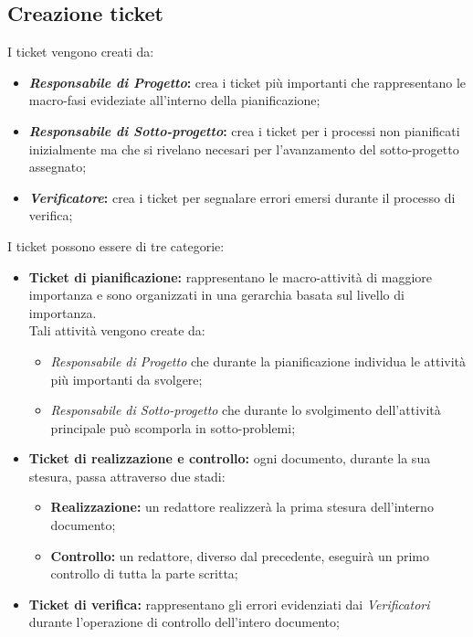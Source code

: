   \subsection{Creazione ticket}
    I ticket vengono creati da:
    \begin{itemize}
      \item \textbf{\emph{Responsabile di Progetto}: }crea i ticket più importanti che rappresentano le macro-fasi evideziate
      all'interno della pianificazione;
      \item \textbf{\emph{Responsabile di Sotto-progetto}: }crea i ticket per i processi non pianificati inizialmente ma che si rivelano necesari
      per l'avanzamento del sotto-progetto assegnato;
      \item \textbf{\emph{Verificatore}: }crea i ticket per segnalare errori emersi durante il processo di verifica;
    \end{itemize}
    I ticket possono essere di tre categorie:
    \begin{itemize}
      \item \textbf{Ticket di pianificazione: }rappresentano le macro-attività di maggiore importanza e sono organizzati in una gerarchia
      basata sul livello di importanza.\\
      Tali attività vengono create da:
      \bgroup
        \begin{itemize}
          \item \emph{Responsabile di Progetto} che durante la pianificazione individua le attività più importanti da svolgere;
          \item \emph{Responsabile di Sotto-progetto} che durante lo svolgimento dell'attività principale può scomporla in sotto-problemi;
        \end{itemize}
      \egroup
      \item \textbf{Ticket di realizzazione e controllo: }ogni documento, durante la sua stesura, passa attraverso due stadi:
      \bgroup
        \begin{itemize}
          \item \textbf{Realizzazione: }un redattore realizzerà la prima stesura dell'interno documento;
          \item \textbf{Controllo: }un redattore, diverso dal precedente, eseguirà un primo controllo di tutta la parte scritta;
        \end{itemize}
      \egroup
      \item \textbf{Ticket di verifica: }rappresentano gli errori evidenziati dai \emph{Verificatori} durante l'operazione di controllo dell'intero documento;
    \end{itemize}
